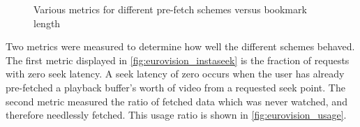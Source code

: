 
\begin{figure}[t]
    \centering


    \caption{Various metrics for different pre-fetch schemes versus bookmark length}

\end{figure}

Two metrics were measured to determine how well the different schemes behaved. The first metric displayed in \autoref{fig:eurovision_instaseek} is the fraction of requests with zero seek latency. A seek latency of zero occurs when the user has already pre-fetched a playback buffer's worth of video from a requested seek point. The second metric measured the ratio of fetched data which was never watched, and therefore needlessly fetched. This usage ratio is shown in \autoref{fig:eurovision_usage}.

